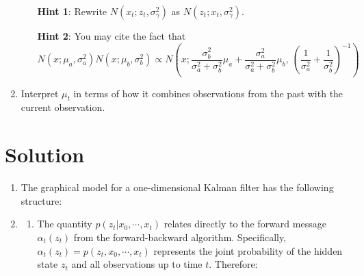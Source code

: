 \documentclass[submit]{../harvardml}
\newcommand{\siggam}{\sigma_{\gamma}}
\newenvironment{solution}
  {\color{blue}\section*{Solution}}
{}
\begin{document}
\begin{problem}
\begin{enumerate}
\begin{enumerate}
      \textbf{Hint 1}: Rewrite $N(x_t; z_t, \siggam^2)$ as $N(z_t; x_t, \siggam^2)$.
      
      \textbf{Hint 2}: You may cite the fact that 
      \[N(x; \mu_a, \sigma^2_a)N(x; \mu_b, \sigma^2_b) \propto N\left(x; \frac{\sigma^2_b}{\sigma^2_a+\sigma^2_b}\mu_a + \frac{\sigma^2_a}{\sigma^2_a+\sigma^2_b}\mu_b, \ \left(\frac{1}{\sigma^2_a} + \frac{1}{\sigma^2_b}\right)^{-1}\right)\]
  \end{enumerate}
  \item Interpret $\mu_t$ in terms of how it combines observations from the past with the current observation. 
\end{enumerate}
\end{problem}


\newpage

\begin{solution}
\begin{enumerate}
    \item The graphical model for a one-dimensional Kalman filter has the following structure:
    
    
    \item 
    \begin{enumerate}
        \item The quantity $p(z_t| x_0, \cdots, x_{t})$ relates directly to the forward message $\alpha_t(z_t)$ from the forward-backward algorithm. Specifically, $\alpha_t(z_t) = p(z_t, x_0, \cdots, x_t)$ represents the joint probability of the hidden state $z_t$ and all observations up to time $t$. Therefore:
        

\end{enumerate}
\end{enumerate}
\end{solution}
\end{document}
